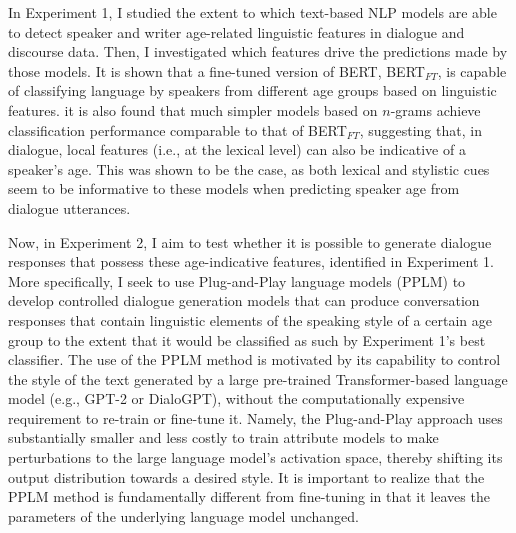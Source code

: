 In Experiment 1, I studied the extent to which text-based NLP models are able to detect speaker and writer age-related linguistic features in dialogue and discourse data. Then, I investigated which features drive the predictions made by those models. It is shown that a fine-tuned version of BERT, BERT$_{FT}$, is capable of classifying language by speakers from different age groups based on linguistic features. it is also found that much simpler models based on $n$-grams achieve classification performance comparable to that of BERT$_{FT}$, suggesting that, in dialogue, local features (i.e., at the lexical level) can also be indicative of a speaker's age. This was shown to be the case, as both lexical and stylistic cues seem to be informative to these models when predicting speaker age from dialogue utterances.

Now, in Experiment 2, I aim to test whether it is possible to generate dialogue responses that possess these age-indicative features, identified in Experiment 1. 
More specifically, I seek to use Plug-and-Play language models (PPLM) \citep{dathathri2019plug} to develop controlled dialogue generation models that can produce conversation responses that contain linguistic elements of the speaking style of a certain age group to the extent that it would be classified as such by Experiment 1's best classifier. The use of the PPLM method is motivated by its capability to control the style of the text generated by a large pre-trained Transformer-based language model (e.g., GPT-2 or DialoGPT), without the computationally expensive requirement to re-train or fine-tune it. Namely, the Plug-and-Play approach uses substantially smaller and less costly to train attribute models to make perturbations to the large language model's activation space, thereby shifting its output distribution towards a desired style. It is important to realize that the PPLM method is fundamentally different from fine-tuning in that it leaves the parameters of the underlying language model unchanged.

